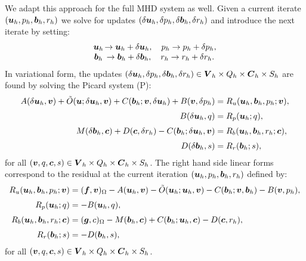 We adapt this approach for the full MHD system as well. Given a current iterate $(\boldsymbol u_h,p_h,\boldsymbol b_h,r_h)$  we solve for updates $(\delta \boldsymbol u_h,\delta p_h,\delta \boldsymbol b_h,\delta r_h)$ and introduce the next iterate by setting:
\begin{equation}\nonumber
\begin{array}{cc}
\uu{u}_h& \hspace{-3mm} \rightarrow \uu{u}_h +\delta \uu{u}_h, \quad p_h \rightarrow p_h +\delta p_h,\\
\uu{b}_h& \hspace{-3mm}  \rightarrow \uu{b}_h +\delta \uu{b}_h, \quad r_h \rightarrow r_h +\delta r_h.
\end{array}
\end{equation}
In variational form, the updates $(\delta \boldsymbol u_h,\delta p_h,\delta \boldsymbol b_h,\delta r_h)\in \boldsymbol V_h\times Q_h \times \boldsymbol C_h\times S_h$ are found by solving the Picard system (P):
\begin{equation} \nonumber
\begin{split}
A(\delta\boldsymbol u_h, \boldsymbol v) +\tilde{O}(\boldsymbol u;\delta\boldsymbol u_h,\boldsymbol v)+ C(\boldsymbol b_h;\boldsymbol v,\delta \boldsymbol u_h) + B(\boldsymbol v, \delta p_h) & = R_u(\boldsymbol u_h,\boldsymbol b_h,p_h;\boldsymbol v),\\[.1cm]
B(\delta\boldsymbol u_h,q)&= R_p(\boldsymbol u_h;q), \\[.1cm]
M(\delta \boldsymbol b_h,\boldsymbol c)+
D(\boldsymbol c,\delta r_h)-C(\boldsymbol b_h;\delta \boldsymbol u_h,\boldsymbol v)&= R_b(\boldsymbol u_h,\boldsymbol b_h,r_h;\boldsymbol c),\\[.1cm]
D(\delta \boldsymbol b_h,s)&= R_r(\boldsymbol b_h;s),
\end{split}
\end{equation}
for all $(\boldsymbol v,q,\boldsymbol c,s)\in \boldsymbol V_h\times Q_h \times \boldsymbol C_h\times S_h$. The right hand side linear forms correspond to the residual at the current iteration $(\boldsymbol u_h,p_h,\boldsymbol b_h,r_h)$ defined by:
\begin{align*}
 R_u(\boldsymbol u_h,\boldsymbol b_h,p_h;\boldsymbol v)&=(\boldsymbol f, \boldsymbol v)_\Omega-A(\boldsymbol u_h,\boldsymbol v)
-  \tilde{O}(\boldsymbol u_h;\boldsymbol u_h,\boldsymbol v)  - C(\boldsymbol b_h;\boldsymbol v,\boldsymbol b_h)-B(\boldsymbol v,p_h),\\[.1cm]
R_p(\boldsymbol u_h;q)&=-B(\boldsymbol u_h,q),\\[.1cm]
 R_b(\boldsymbol u_h,\boldsymbol b_h,r_h;\boldsymbol c)&=(\boldsymbol g,c)_\Omega -M(\boldsymbol b_h,\boldsymbol c)
+ C(\boldsymbol b_h;\boldsymbol u_h,\boldsymbol c)-D(\boldsymbol c,r_h),\\[.1cm]
R_r(\boldsymbol b_h;s)&=-D(\boldsymbol b_h,s),
\end{align*}
for all $(\boldsymbol v,q,\boldsymbol c,s)\in \boldsymbol V_h\times Q_h \times \boldsymbol C_h\times S_h$.

